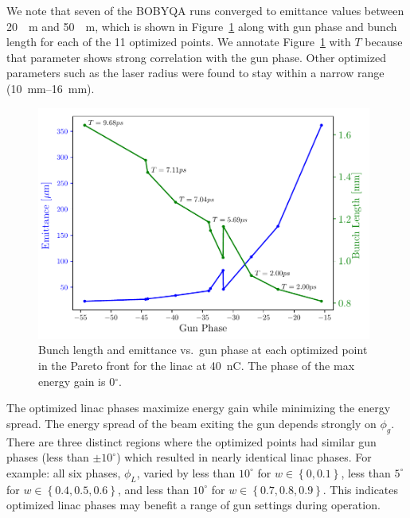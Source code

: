 \documentclass{iitthesis}
\begin{document}
We note that seven of the BOBYQA runs converged to emittance values
between \SI{20}{\mu m} and \SI{50}{\mu m}, which is shown in Figure~\ref{fig:trade} 
along with gun phase and bunch length for each of the 11
optimized points. We annotate Figure~\ref{fig:trade} with $T$ because that parameter 
shows strong correlation with the gun phase. Other optimized parameters such as the laser radius were found to stay within a 
narrow range (\SIrange{10}{16}{mm}).  
\begin{figure}[h]
	\captionsetup{width=0.98\linewidth}
	\begin{center}
		\includegraphics[width=0.98\textwidth]{images/THPAB155f3}
		\caption{\label{fig:trade}Bunch length and emittance vs.~gun phase at each optimized point in the Pareto front for the linac at \SI{40}{nC}. The phase of the max energy gain is 0$^{\circ}$.}
	\end{center}
\end{figure}


The optimized linac phases maximize energy gain while minimizing the energy spread.
The energy spread of the beam exiting the gun depends strongly on $\phi_g$.
There are three distinct regions where the optimized points had similar gun phases 
(less than $\pm10^{\circ}$) which resulted in nearly identical linac phases. For example:  
all six phases, $\phi_L$, varied by less than $10^{\circ}$ for $w \in \left\{ 0, 0.1\right\}$,
less than $5^{\circ}$ for $w \in \left\{ 0.4, 0.5, 0.6\right\}$, 
and less than $10^{\circ}$ for $w \in \left\{ 0.7, 0.8, 0.9\right\}$.
This indicates optimized linac phases may benefit a range of gun settings during operation. 
\end{document}
